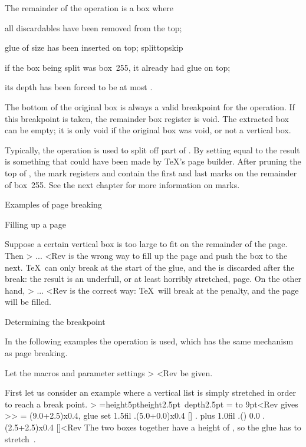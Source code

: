 The remainder of the  operation is a box where
\itemlist \item all discardables have been removed
      from the top;
\item glue of size  has been inserted on top;
\csterm splittopskip\par
      if the box being split was box~255, it
      already had  glue on top;
\item its depth has been forced to be at most .
\>

The bottom of the original box is always a valid breakpoint
for the  operation. If this breakpoint is taken,
the remainder box register is void. The extracted box
can be empty; it is only void if the original box
was void, or not a vertical box.

Typically, the  operation is used to split off part
of . By setting  equal to 
the result is something that could have been made by \TeX's page
builder. After pruning the top of , the 
mark registers  and  contain the first
and last marks on the remainder of box~255.
See the next chapter for more information on marks.

\point Examples of page breaking

\spoint Filling up a page

Suppose a certain vertical box is too large
to fit on the remainder of the page.
Then \Ver>\vfil\vbox{ ... }<Rev is the wrong way
to fill up the page and push the box to the next.
\TeX\ can only break at the start of the glue, and
the  is discarded after the break: the result
is an underfull, or at least horribly stretched, page.
On the other hand,
\Ver>\vfil{} %
\vbox{ ... }<Rev is the correct way: \TeX\ will break
at the penalty, and the page will be filled.

\spoint Determining the breakpoint

In the following examples the  operation is
used, which has the same
mechanism as page breaking.

Let the macros and
parameter settings
\Ver>\offinterlineskip {}
\def\High{\hbox{\vrule height5pt}}
\def\HighAndDeep{\hbox{\vrule height2.5pt depth2.5pt}}<Rev
be given.

First let us consider
an example where a vertical list is simply stretched
in order to reach a break point.
\Ver>\splitmaxdepth=4pt 
=\vbox{\High \vfil \HighAndDeep}
= to 9pt<Rev
gives \Ver>> =
\vbox(9.0+2.5)x0.4, glue set 1.5fil
.\hbox(5.0+0.0)x0.4 []
. plus 1.0fil
.\glue(\lineskip) 0.0
.\hbox(2.5+2.5)x0.4 []<Rev
The two boxes together have a height of \n{7.5pt},
so the glue has to stretch~\n{1.5pt}.

